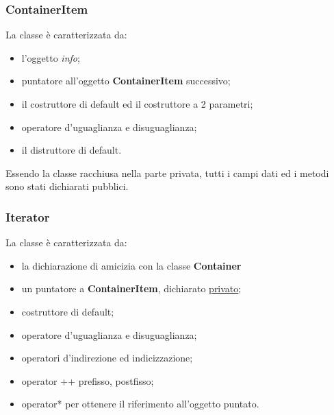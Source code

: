 {{			\subsubsection{ContainerItem}{
				La classe è caratterizzata da:
				\begin{itemize}\itemsep=0.5pt
					\item l'oggetto \textit{info};
					\item puntatore all'oggetto \textbf{ContainerItem} successivo;
					\item il costruttore di default ed il costruttore a 2 parametri;
					\item operatore d'uguaglianza e disuguaglianza;
					\item il distruttore di default.
				\end{itemize}
				Essendo la classe racchiusa nella parte privata, tutti i campi dati ed i metodi sono stati dichiarati pubblici.
			}
			\subsubsection{Iterator}{
				La classe è caratterizzata da:
				\begin{itemize}\itemsep=0.5pt
					\item la dichiarazione di amicizia con la classe \textbf{Container}
					\item un puntatore a \textbf{ContainerItem}, dichiarato \underline{privato};
					\item costruttore di default;
					\item operatore d'uguaglianza e disuguaglianza;
					\item operatori d'indirezione ed indicizzazione;
					\item operator ++ prefisso, postfisso;
					\item operator* per ottenere il riferimento all'oggetto puntato.
				\end{itemize}
			}
}}
